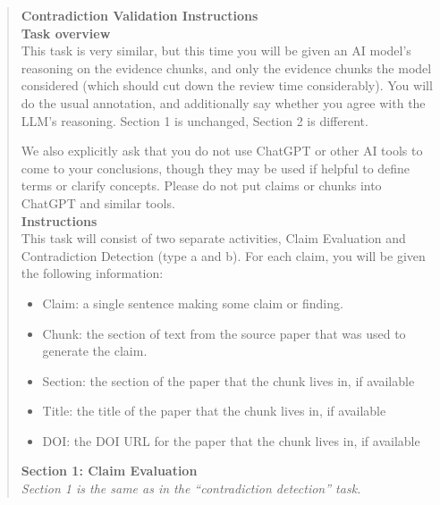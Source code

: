\documentclass{article}
\begin{document}
\begin{quote}
\textbf{Contradiction Validation Instructions }\\
\textbf{Task overview}\\
This task is very similar, but this time you will be given an AI model's reasoning on the evidence chunks, and only the evidence chunks the model considered (which should cut down the review time considerably). You will do the usual annotation, and additionally say whether you agree with the LLM's reasoning. Section 1 is unchanged, Section 2 is different.

We also explicitly ask that you do not use ChatGPT or other AI tools to come to your conclusions, though they may be used if helpful to define terms or clarify concepts. Please do not put claims or chunks into ChatGPT and similar tools.
\\
\textbf{Instructions}\\
This task will consist of two separate activities, Claim Evaluation and Contradiction Detection (type a and b). For each claim, you will be given the following information:
\begin{itemize}
    \item Claim: a single sentence making some claim or finding.
    \item Chunk: the section of text from the source paper that was used to generate the claim.
    \item Section: the section of the paper that the chunk lives in, if available
    \item Title: the title of the paper that the chunk lives in, if available
    \item DOI: the DOI URL for the paper that the chunk lives in, if available
\end{itemize}

\textbf{Section 1: Claim Evaluation}\\
\textit{\*\*Section 1 is the same as in the ``contradiction detection'' task.\*\*}


\end{quote}
\end{document}

